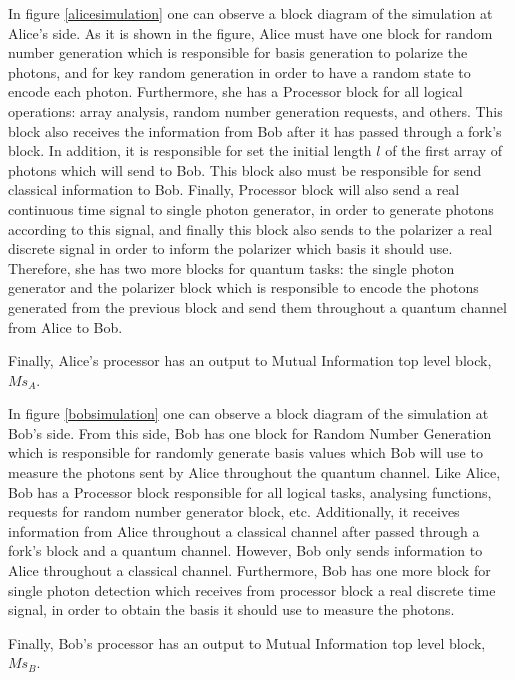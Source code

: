     In figure \ref{alicesimulation} one can observe a block diagram of the simulation at Alice's side. As it is shown in the figure, Alice must have one block for random number generation which is responsible for basis generation to polarize the photons, and for key random generation in order to have a random state to encode each photon. Furthermore, she has a Processor block for all logical operations: array analysis, random number generation requests, and others. This block also receives the information from Bob after it has passed through a fork's block. In addition, it is responsible for set the initial length $l$ of the first array of photons which will send to Bob. This block also must be responsible for send classical information to Bob. Finally, Processor block will also send a real continuous time signal to single photon generator, in order to generate photons according to this signal, and finally this block also sends to the polarizer a real discrete signal in order to inform the polarizer which basis it should use. Therefore, she has two more blocks for quantum tasks: the single photon generator and the polarizer block which is responsible to encode the photons generated from the previous block and send them throughout a quantum channel from Alice to Bob.

    Finally, Alice's processor has an output to Mutual Information top level block, $Ms_{A}$.

     In figure \ref{bobsimulation} one can observe a block diagram of the simulation at Bob's side. From this side, Bob has one block for Random Number Generation which is responsible for randomly generate basis values which Bob will use to measure the photons sent by Alice throughout the quantum channel. Like Alice, Bob has a Processor block responsible for all logical tasks, analysing functions, requests for random number generator block, etc. Additionally, it receives information from Alice throughout a classical channel after passed through a fork's block and a quantum channel. However, Bob only sends information to Alice throughout a classical channel. Furthermore, Bob has one more block for single photon detection which receives from processor block a real discrete time signal, in order to obtain the basis it should use to measure the photons.

    Finally, Bob's processor has an output to Mutual Information top level block, $Ms_{B}$.



